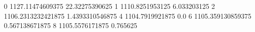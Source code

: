 0 1127.11474609375 22.32275390625
1 1110.8251953125 6.033203125
2 1106.2313232421875 1.4393310546875
4 1104.7919921875 0.0
6 1105.359130859375 0.567138671875
8 1105.5576171875 0.765625
